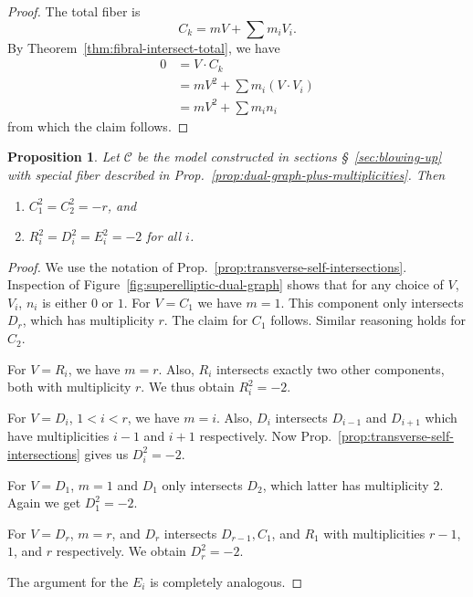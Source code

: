 \documentclass[pagesize,paper=letter]{scrartcl}
\newcommand{\scd}{\mathscr{C}}
\theoremstyle{plain}
\newtheorem{proposition}[theorem]{Proposition}
\theoremstyle{definition}
\theoremstyle{remark}
\begin{document}
\begin{proof}
  The total fiber is
  \[
  C_k = mV + \sum m_i V_i.
  \]
  By Theorem~\ref{thm:fibral-intersect-total}, we have
  \begin{align*}
    0 &= V \cdot C_k \\
    &= mV^2 + \sum m_i (V \cdot V_i) \\
    &= mV^2 + \sum m_i n_i
  \end{align*}
  from which the claim follows.
\end{proof}

\begin{proposition}\label{prop:self-intersect-superelliptic}
  Let $\scd$ be the model constructed in sections \S~\ref{sec:blowing-up} with special fiber described in Prop.~\ref{prop:dual-graph-plus-multiplicities}. Then
  \begin{enumerate}
      \item $C_1^2 = C_2^2 = -r$, and
      \item $R_i^2 = D_i^2 = E_i^2 = -2$ for all $i$.
  \end{enumerate}
\end{proposition}

\begin{proof}
  We use the notation of Prop.~\ref{prop:transverse-self-intersections}. Inspection of Figure~\ref{fig:superelliptic-dual-graph} shows that for any choice of $V$, $V_i$, $n_i$ is either $0$ or $1$. For $V = C_1$ we have $m = 1$. This component only intersects $D_r$, which has multiplicity $r$. The claim for $C_1$ follows. Similar reasoning holds for $C_2$.

  For $V = R_i$, we have $m = r$. Also, $R_i$ intersects exactly two other components, both with multiplicity $r$. We thus obtain $R_i^2 = -2$.

  For $V = D_i$, $1 < i < r$, we have $m = i$. Also, $D_i$ intersects $D_{i-1}$ and $D_{i+1}$ which have multiplicities $i-1$ and $i+1$ respectively. Now Prop.~\ref{prop:transverse-self-intersections} gives us $D_i^2 = -2$.

  For $V = D_1$, $m = 1$ and $D_1$ only intersects $D_2$, which latter has multiplicity $2$. Again we get $D_1^2 = -2$.

  For $V = D_r$, $m = r$, and $D_r$ intersects $D_{r-1}, C_1$, and $R_1$ with multiplicities $r-1$, $1$, and $r$ respectively. We obtain $D_r^2 = -2$.

  The argument for the $E_i$ is completely analogous.
\end{proof}
\end{document}
